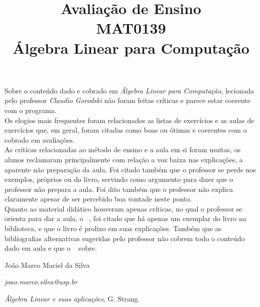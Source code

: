 \documentclass{article}
\date{}
\title{Avaliação de Ensino\\
       MAT0139\\
       Álgebra Linear para Computação}
\author{}
\begin{document}
\maketitle
\thispagestyle{empty}

\indent Sobre o conteúdo dado e cobrado em \textit{Álgebra Linear para Computação}, lecionada pelo professor 
\textit{Claudio Gorodski} não foram feitas críticas e parece estar coerente com o programa.\\
\indent Os elogios mais frequentes foram relacionados as listas de exercícios e as aulas de exercícios que, em geral,
foram citadas como boas ou ótimas e coerentes com o cobrado em avaliações. \\
\indent As critícas relacionadas ao método de ensino e a aula em si foram muitas, os alunos reclamaram principalmente
 com relação a voz baixa nas explicações, a aparente não preparação da aula. Foi citado também que o professor se 
 perde nos exemplos, próprios ou do livro, servindo como argumento para dizer que o professor não prepara a aula.
  Foi dito também que o professor não explica claramente apesar de ser percebido boa vontade neste ponto.\\
\indent Quanto ao material didático houveram apenas críticas, no qual o professor se orienta para dar a aula, o 
~\cite{STR}, foi citado que há apenas um exemplar do livro na biblioteca, e que o livro é prolixo em suas explicações.
Também que as bibliografias alternativas sugeridas pelo professor não cobrem todo o conteúdo dado em aula e que o 
~\cite{STR} cobre.


\vspace{6ex}

João Marco Maciel da Silva

\emph{joao.marco.silva@usp.br}

\vspace{11ex}

\begin{thebibliography}{99}

	 \emph{Álgebra Linear e suas aplicações}, G. Strang.
	
\end{thebibliography}
\end{document}
